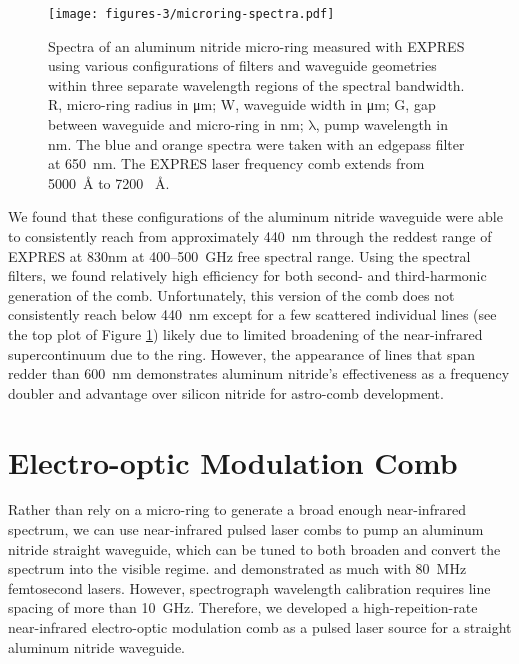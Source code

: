 \begin{figure}
    \centering
    \texttt{[image: figures-3/microring-spectra.pdf]}
    \caption[EXPRES-measured spectra from an aluminum nitride micro-ring]{Spectra of an aluminum nitride micro-ring measured with EXPRES using various configurations of filters and waveguide geometries within three separate wavelength regions of the spectral bandwidth. R, micro-ring radius in \si{\micro\meter}; W, waveguide width in \si{\micro\meter}; G, gap between waveguide and micro-ring in \si{\nano\meter}; $\mathrm{\lambda}$, pump wavelength in \si{\nano\meter}. The blue and orange spectra were taken with an edgepass filter at 650~\si{\nano\meter}. The EXPRES laser frequency comb extends from 5000~\si{\angstrom} to 7200~
    \si{\angstrom}.}
    \label{fig:microring-spectra}
\end{figure}

We found that these configurations of the aluminum nitride waveguide were able to consistently reach from approximately 440~\si{\nano\meter} through the reddest range of EXPRES at 830\si{\nano\meter} at 400--500~\si{\giga\hertz} free spectral range. Using the spectral filters, we found relatively high efficiency for both second- and third-harmonic generation of the comb. Unfortunately, this version of the comb does not consistently reach below 440~\si{\nano\meter} except for a few scattered individual lines (see the top plot of Figure \ref{fig:microring-spectra}) likely due to limited broadening of the near-infrared supercontinuum due to the ring. However, the appearance of lines that span redder than 600~\si{\nano\meter} demonstrates aluminum nitride's effectiveness as a frequency doubler and advantage over silicon nitride for astro-comb development.

\section{Electro-optic Modulation Comb} \label{astro-comb:eom}

Rather than rely on a micro-ring to generate a broad enough near-infrared spectrum, we can use near-infrared pulsed laser combs to pump an aluminum nitride straight waveguide, which can be tuned to both broaden and convert the spectrum into the visible regime. \citet{liu_beyond_2019} and \citet{lu_ultraviolet_2020} demonstrated as much with 80~\si{\mega\hertz} femtosecond lasers. However, spectrograph wavelength calibration requires line spacing of more than 10~\si{\giga\hertz}. Therefore, we developed a high-repeition-rate near-infrared electro-optic modulation comb as a pulsed laser source for a straight aluminum nitride waveguide.

